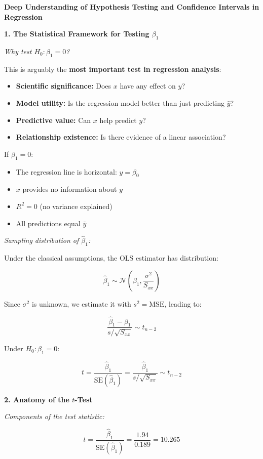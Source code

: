 \documentclass[12pt]{article}
\begin{document}
\begin{explanation}
\textbf{Deep Understanding of Hypothesis Testing and Confidence Intervals in Regression}

\textbf{1. The Statistical Framework for Testing $\beta_1$}

\textit{Why test $H_0: \beta_1 = 0$?}

This is arguably the \textbf{most important test in regression analysis}:

\begin{itemize}
    \item \textbf{Scientific significance:} Does $x$ have any effect on $y$?
    \item \textbf{Model utility:} Is the regression model better than just predicting $\bar{y}$?
    \item \textbf{Predictive value:} Can $x$ help predict $y$?
    \item \textbf{Relationship existence:} Is there evidence of a linear association?
\end{itemize}

If $\beta_1 = 0$:
\begin{itemize}
    \item The regression line is horizontal: $y = \beta_0$
    \item $x$ provides no information about $y$
    \item $R^2 = 0$ (no variance explained)
    \item All predictions equal $\bar{y}$
\end{itemize}

\textit{Sampling distribution of $\hat{\beta}_1$:}

Under the classical assumptions, the OLS estimator has distribution:

\[
\hat{\beta}_1 \sim \mathcal{N}\left(\beta_1, \frac{\sigma^2}{S_{xx}}\right)
\]

Since $\sigma^2$ is unknown, we estimate it with $s^2 = \text{MSE}$, leading to:

\[
\frac{\hat{\beta}_1 - \beta_1}{s/\sqrt{S_{xx}}} \sim t_{n-2}
\]

Under $H_0: \beta_1 = 0$:

\[
t = \frac{\hat{\beta}_1}{\text{SE}(\hat{\beta}_1)} = \frac{\hat{\beta}_1}{s/\sqrt{S_{xx}}} \sim t_{n-2}
\]

\textbf{2. Anatomy of the $t$-Test}

\textit{Components of the test statistic:}

\[
t = \frac{\hat{\beta}_1}{\text{SE}(\hat{\beta}_1)} = \frac{1.94}{0.189} = 10.265
\]


\end{explanation}
\end{document}
